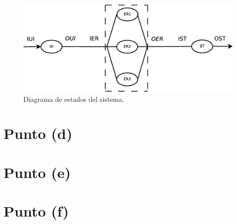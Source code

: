 \documentclass[a4paper,10pt]{article}
\begin{document}
\begin{figure}[h]
\begin{center}
\includegraphics[width=12cm]{./states.eps}
\caption{\label{fig:events_diagram} Diagrama de estados del sistema.}
\end{center}
\end{figure}

\section{Punto (d)}

\section{Punto (e)}

\section{Punto (f)}
\end{document}
